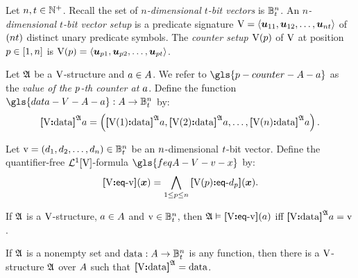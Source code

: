 Let $n, t \in \mathbb{N}^{+}$.
Recall the set of \emph{$n$-dimensional $t$-bit vectors} is
$\mathbb{B}_{t}^{n}$.
An \emph{$n$-dimensional $t$-bit vector setup} is a predicate signature 
${\mathrm{V}} = \left\langle \bm{u}_{11}, \bm{u}_{12}, \dots, \bm{u}_{nt} \right\rangle$ of $(nt)$
distinct unary predicate symbols.
The \emph{counter setup ${\mathrm{V}}(p)$} of ${\mathrm{V}}$ at position $p \in [1,n]$
is ${\mathrm{V}}(p) = \left\langle \bm{u}_{p1},\bm{u}_{p2},\dots,\bm{u}_{pt} \right\rangle$.

\begin{definition}
Let $\mathfrak{A}$ be a ${\mathrm{V}}$-structure and $a \in A$.
We refer to $\gls{p-counter-A-a}$ as the 
\emph{value of the $p$-th counter at $a$}.
Define the function $\gls{data-V-A-a} : \domA \to \ntBitnums\nn\tbit$ by:
\[
  {\bm{[}{\mathrm{V}}\mathord{\bm{:}}\mathrm{data}\bm{]}}^{\mathfrak{A}}a = \left({\bm{[}{\mathrm{V}}(1)\mathord{\bm{:}}\mathrm{data}\bm{]}}^{\mathfrak{A}}a, {\bm{[}{\mathrm{V}}(2)\mathord{\bm{:}}\mathrm{data}\bm{]}}^{\mathfrak{A}}a,
  \dots, {\bm{[}{\mathrm{V}}(n)\mathord{\bm{:}}\mathrm{data}\bm{]}}^{\mathfrak{A}}a\right).
\]
\end{definition}
\begin{definition}
Let $\mathrm{v} = (d_1, d_2, \dots, d_n) \in \mathbb{B}_{t}^{n}$ be
an $n$-dimensional $t$-bit vector.
Define the quantifier-free $\mathcal{L}^{1}[{\mathrm{V}}]$-formula $\gls{feqA-V-v-x}$ by:
\[
  {\bm{[}{\mathrm{V}}\mathord{\bm{:}}\mathsf{eq}{\hbox{-}}\mathrm{v}\bm{]}}(\bm{x}) = \bigwedge_{1 \leq p \leq n}
  {\bm{[}{\mathrm{V}}(p)\mathord{\bm{:}}\mathsf{eq}{\hbox{-}}d_p\bm{]}}(\bm{x}).
\]
\end{definition}
\begin{remark}
If $\mathfrak{A}$ is a ${\mathrm{V}}$-structure, $a \in A$ and
$\mathrm{v} \in \mathbb{B}_{t}^{n}$, then $\mathfrak{A} \vDash {\bm{[}{\mathrm{V}}\mathord{\bm{:}}\mathsf{eq}{\hbox{-}}\mathrm{v}\bm{]}}(a)$ iff
${\bm{[}{\mathrm{V}}\mathord{\bm{:}}\mathrm{data}\bm{]}}^{\mathfrak{A}}a = \mathrm{v}$.

If $\mathfrak{A}$ is a nonempty set and $\operatorname{data} : A \to \mathbb{B}_{t}^{n}$ is any
function, then there is a ${\mathrm{V}}$-structure $\mathfrak{A}$ over $A$ such that
${\bm{[}{\mathrm{V}}\mathord{\bm{:}}\mathrm{data}\bm{]}}^{\mathfrak{A}} = \operatorname{data}$.
\end{remark}

